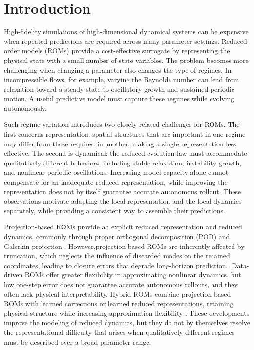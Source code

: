 \section{Introduction}

High-fidelity simulations of high-dimensional dynamical systems
can be expensive when repeated predictions are required across many parameter settings. Reduced-order models (ROMs) provide a cost-effective surrogate by representing the physical state with a small number of state variables. The problem becomes more challenging when changing a parameter also changes the type of regimes. In incompressible flows, for example, varying the Reynolds number can lead from relaxation toward a steady state to oscillatory growth and sustained periodic motion. A useful predictive model must capture these regimes while evolving autonomously.



Such regime variation introduces two closely related challenges for ROMs. The first concerns representation: spatial structures that are important in one regime may differ from those required in another, making a single representation less effective. The second is dynamical: the reduced evolution law must accommodate qualitatively different behaviors, including stable relaxation, instability growth, and nonlinear periodic oscillations. Increasing model capacity alone cannot compensate for an inadequate reduced representation, while improving the representation does not by itself guarantee accurate autonomous rollout. These observations motivate adapting the local representation and the local dynamics separately, while providing a consistent way to assemble their predictions.




Projection-based ROMs provide an explicit reduced representation and reduced dynamics, commonly through proper orthogonal decomposition (POD) and Galerkin projection \citep{sirovich1987,berkooz1993,benner2015}. However,projection-based ROMs are inherently affected by truncation, which neglects the influence of discarded modes on the retained coordinates, leading to closure errors that degrade long-horizon prediction.\citep{amsallem2012}. Data-driven ROMs offer greater flexibility in approximating nonlinear dynamics, but low one-step error does not guarantee accurate autonomous rollouts, and they often lack physical interpretability\citep{duraisamy2019,brunton2020}. Hybrid ROMs combine projection-based ROMs with learned corrections or learned reduced representations, retaining physical structure while increasing approximation flexibility
\citep{dar2023,lee2020,fresca2022,geelen2023}. These developments improve the modeling of reduced dynamics, but they do not by themselves resolve the representational difficulty that arises when qualitatively different regimes must be described over a broad parameter range.





